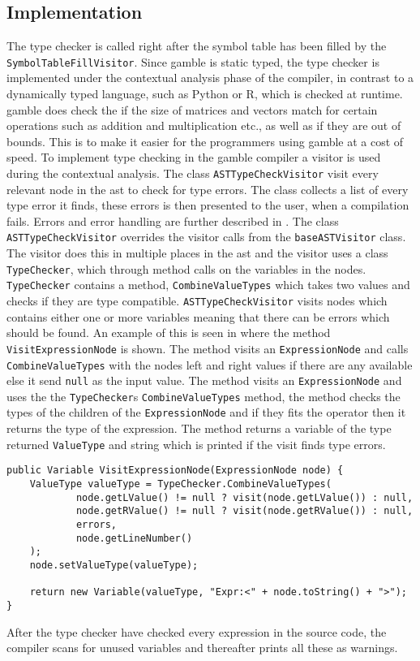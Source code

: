 \subsection*{Implementation}
The type checker is called right after the symbol table has been filled by the \texttt{SymbolTableFillVisitor}.
Since \gls{gamble} is static typed, the type checker is implemented under the contextual analysis phase of the compiler, in contrast to a dynamically typed language, such as Python or R, which is checked at runtime. 
\gls{gamble} does check the if the size of matrices and vectors match for certain operations such as addition and multiplication etc., as well as if they are out of bounds. 
This is to make it easier for the programmers using \gls{gamble} at a cost of speed. 
To implement type checking in the \gls{gamble} compiler a visitor is used during the contextual analysis.
The class \texttt{ASTTypeCheckVisitor} visit every relevant node in the \acrshort{ast} to check for type errors.
The class collects a list of every type error it finds, these errors is then presented to the user, when a compilation fails.
Errors and error handling are further described in .
The class \texttt{ASTTypeCheckVisitor} overrides the visitor calls from the \texttt{baseASTVisitor} class.
The visitor does this in multiple places in the \acrshort{ast} and the visitor uses a class \texttt{TypeChecker}, which through method calls on the variables in the nodes.
\texttt{TypeChecker} contains a method, \texttt{CombineValueTypes} which takes two values and checks if they are type compatible.
\texttt{ASTTypeCheckVisitor} visits nodes which contains either one or more variables meaning that there can be errors which should be found. 
An example of this is seen in  where the method \texttt{VisitExpressionNode}
 is shown.
The method visits an \texttt{ExpressionNode} and calls \texttt{CombineValueTypes} with the nodes left and right values if there are any available else it send \texttt{null} as the input value.
The method visits an \texttt{ExpressionNode} and uses the the \texttt{TypeChecker}s \texttt{CombineValueTypes} method, the method checks the types of the children of the \texttt{ExpressionNode} and if they fits the operator then it returns the type of the expression. 
The method returns a variable of the type returned \texttt{ValueType} and string which is printed if the visit finds type errors.

\begin{lstlisting}[caption=The VisitExprressionNode method in the ASTTypeChecker class,numbers=none,frame=tlrb,label={lst:typecheck1}]
public Variable VisitExpressionNode(ExpressionNode node) {
    ValueType valueType = TypeChecker.CombineValueTypes(
            node.getLValue() != null ? visit(node.getLValue()) : null,
            node.getRValue() != null ? visit(node.getRValue()) : null,
            errors,
            node.getLineNumber()
    );
    node.setValueType(valueType);

    return new Variable(valueType, "Expr:<" + node.toString() + ">");
}
\end{lstlisting}

After the type checker have checked every expression in the source code, the compiler scans for unused variables and thereafter prints all these as warnings. 